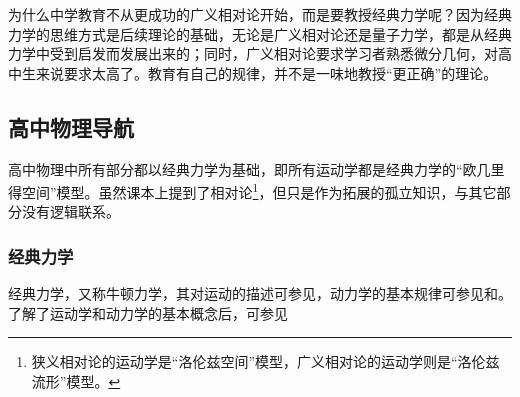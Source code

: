 为什么中学教育不从更成功的广义相对论开始，而是要教授经典力学呢？因为经典力学的思维方式是后续理论的基础，无论是广义相对论还是量子力学，都是从经典力学中受到启发而发展出来的；同时，广义相对论要求学习者熟悉微分几何，对高中生来说要求太高了。教育有自己的规律，并不是一味地教授“更正确”的理论。





\subsection{高中物理导航}


高中物理中所有部分都以经典力学为基础，即所有运动学都是经典力学的“欧几里得空间”模型。虽然课本上提到了相对论\footnote{狭义相对论的运动学是“洛伦兹空间”模型，广义相对论的运动学则是“洛伦兹流形”模型。}，但只是作为拓展的孤立知识，与其它部分没有逻辑联系。




\subsubsection{经典力学}

经典力学，又称牛顿力学，其对运动的描述可参见，动力学的基本规律可参见和。了解了运动学和动力学的基本概念后，可参见






















